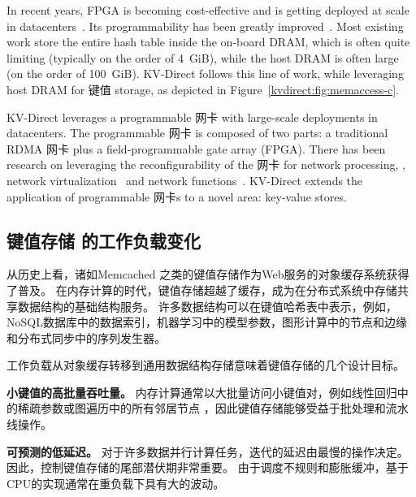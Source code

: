 {In recent years, FPGA is becoming cost-effective and is getting deployed at scale in datacenters~\cite{putnam2014programmable, caulfield2016cloud}. Its programmability has been greatly improved~\cite{li2016clicknp}.
Most existing work store the entire hash table inside the on-board DRAM, which is often quite limiting (typically on the order of 4~GiB), while the host DRAM is often large (on the order of 100~GiB).
KV-Direct follows this line of work, while leveraging host DRAM for 键值 storage, as depicted in Figure~\ref{kvdirect:fig:memaccess-c}.

KV-Direct leverages a programmable 网卡 with large-scale deployments in datacenters.
The programmable 网卡 is composed of two parts: a traditional RDMA 网卡 plus a field-programmable gate array (FPGA).
There has been research on leveraging the reconfigurability of the 网卡 for network processing, \eg, network virtualization~\cite{greenberg2015sdn, vfp} and network functions~\cite{li2016clicknp}.
KV-Direct extends the application of programmable 网卡s to a novel area: key-value stores.
}

\subsection{键值存储 的工作负载变化}
\label{kvdirect:sec:workload-shift}

\iffalse
\textbf{讨论 serverless computing 中的 shared storage}
\fi

从历史上看，诸如Memcached \cite {fitzpatrick2004distributed}之类的键值存储作为Web服务的对象缓存系统获得了普及。
在内存计算的时代，键值存储超越了缓存，成为在分布式系统中存储共享数据结构的基础结构服务。
许多数据结构可以在键值哈希表中表示，例如，NoSQL数据库中的数据索引\cite {chang2008bigtable}，机器学习中的模型参数\cite {li2014scaling}，图形计算中的节点和边缘\cite {shao2013trinity,xiao17tux2}和分布式同步中的序列发生器\cite {kalia2016design,eris}。

工作负载从对象缓存转移到通用数据结构存储意味着键值存储的几个设计目标。

\textbf {小键值的高批量吞吐量。}
内存计算通常以大批量访问小键值对，例如线性回归中的稀疏参数\cite {li2014algorithmic,xiao17tux2}或图遍历中的所有邻居节点 \cite {shao2013trinity}，因此键值存储能够受益于批处理和流水线操作。

\textbf {可预测的低延迟。}
对于许多数据并行计算任务，迭代的延迟由最慢的操作决定\cite {ousterhout2015ramcloud}。 因此，控制键值存储的尾部潜伏期非常重要。 由于调度不规则和膨胀缓冲，基于CPU的实现通常在重负载下具有大的波动。

